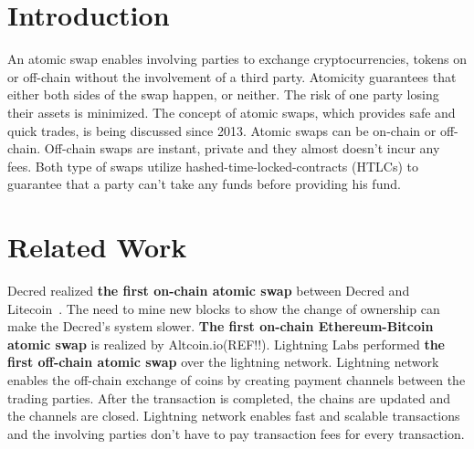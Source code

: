 \section{Introduction}\label{sec:intro}
An atomic swap enables involving parties to exchange cryptocurrencies, tokens on or off-chain without the involvement of a third party. Atomicity guarantees that either both sides of the swap happen, or neither. The risk of one party losing their assets is minimized. The concept of atomic swaps, which provides safe and quick trades, is being discussed since 2013\cite{altcoin}. Atomic swaps can be on-chain or off-chain. Off-chain swaps are instant, private and they almost doesn't incur any fees. Both type of swaps utilize hashed-time-locked-contracts (HTLCs) to guarantee that a party can't take any funds before providing his fund.


\section{Related Work}
Decred realized \textbf{the first on-chain atomic swap} between Decred and Litecoin~\cite{decred}. The need to mine new blocks to show the change of ownership can make the Decred's system slower. \textbf{The first on-chain Ethereum-Bitcoin atomic swap} is realized by Altcoin.io(REF!!). Lightning Labs performed \textbf{the first off-chain atomic swap} over the lightning network. Lightning network enables the off-chain exchange of coins  by creating payment channels between the trading parties. After the transaction is completed, the chains are updated and the channels are closed. Lightning network enables fast and scalable transactions and the involving parties don't have to pay transaction fees for every transaction.

